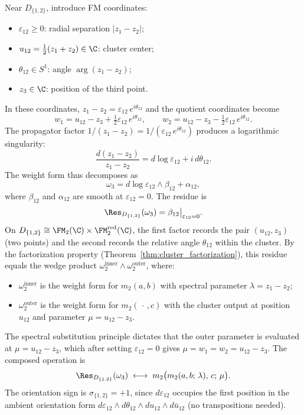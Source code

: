 \begin{computation}[$D_{\{1,2\}}$ residue]
\label{comp:D12}
Near $D_{\{1,2\}}$, introduce FM coordinates:
\begin{itemize}
\item $\varepsilon_{12} \geq 0$: radial separation $|z_1 - z_2|$;
\item $u_{12} = \tfrac{1}{2}(z_1 + z_2) \in \C$: cluster center;
\item $\theta_{12} \in S^1$: angle $\arg(z_1 - z_2)$;
\item $z_3 \in \C$: position of the third point.
\end{itemize}
In these coordinates, $z_1 - z_2 = \varepsilon_{12}\, e^{i\theta_{12}}$ and the quotient coordinates become
\[
w_1 = u_{12} - z_3 + \tfrac{1}{2}\varepsilon_{12}\, e^{i\theta_{12}}, \qquad
w_2 = u_{12} - z_3 - \tfrac{1}{2}\varepsilon_{12}\, e^{i\theta_{12}}.
\]
The propagator factor $1/(z_1 - z_2) = 1/(\varepsilon_{12}\, e^{i\theta_{12}})$ produces a logarithmic singularity:
\[
\frac{d(z_1 - z_2)}{z_1 - z_2} = d\log\varepsilon_{12} + i\, d\theta_{12}.
\]
The weight form thus decomposes as
\[
\omega_3 = d\log\varepsilon_{12} \wedge \beta_{12} + \alpha_{12},
\]
where $\beta_{12}$ and $\alpha_{12}$ are smooth at $\varepsilon_{12} = 0$. The residue is
\[
\Res_{D_{\{1,2\}}}(\omega_3) = \beta_{12}\big|_{\varepsilon_{12}=0}.
\]
On $D_{\{1,2\}} \cong \FM_2(\C) \times \FM_2^{\mathrm{red}}(\C)$, the first factor records the pair $(u_{12}, z_3)$ (two points) and the second records the relative angle $\theta_{12}$ within the cluster. By the factorization property (Theorem~\ref{thm:cluster_factorization}), this residue equals the wedge product $\omega_2^{\text{inner}} \wedge \omega_2^{\text{outer}}$, where:
\begin{itemize}
\item $\omega_2^{\text{inner}}$ is the weight form for $m_2(a, b)$ with spectral parameter $\lambda = z_1 - z_2$;
\item $\omega_2^{\text{outer}}$ is the weight form for $m_2(\,\cdot\,, c)$ with the cluster output at position $u_{12}$ and parameter $\mu = u_{12} - z_3$.
\end{itemize}
The spectral substitution principle dictates that the outer parameter is evaluated at $\mu = u_{12} - z_3$, which after setting $\varepsilon_{12} = 0$ gives $\mu = w_1 = w_2 = u_{12} - z_3$. The composed operation is
\[
\Res_{D_{\{1,2\}}}(\omega_3) \;\longleftrightarrow\; m_2\bigl(m_2(a, b;\, \lambda),\, c;\, \mu\bigr).
\]
The orientation sign is $\sigma_{\{1,2\}} = +1$, since $d\varepsilon_{12}$ occupies the first position in the ambient orientation form $d\varepsilon_{12} \wedge d\theta_{12} \wedge du_{12} \wedge d\bar{u}_{12}$ (no transpositions needed).
\end{computation}

